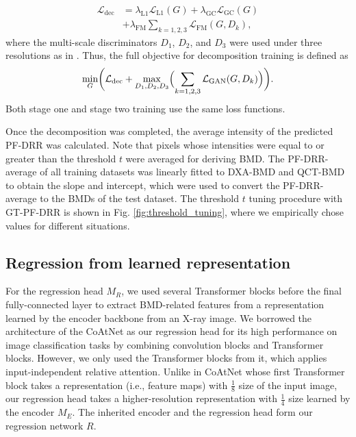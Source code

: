 \documentclass[times,twocolumn,final]{elsarticle}
\begin{document}
{\begin{equation}
\begin{split}
    \mathcal{L}_{\mathrm{dec}}
    & =\lambda_{\mathrm{L1}}\mathcal{L}_{\mathrm{L1}}(G)+\lambda_{\mathrm{GC}}\mathcal{L}_{\mathrm{GC}}(G)\\
    & +\lambda_{\mathrm{FM}}\sum_{k=1,2,3}\mathcal{L}_{\mathrm{FM}}(G,D_k),
\end{split}
\end{equation}
where the multi-scale discriminators $D_1$, $D_2$, and $D_3$ were used under three resolutions as in \citep{wang_high-resolution_2018}. Thus, the full objective for decomposition training is defined as
\begin{equation}
    \min_G\biggl(\mathcal{L}_{\mathrm{dec}}+\max_{D_1,D_2,D_3}\Bigl(\sum_{k=1,2,3}\mathcal{L}_{\mathrm{GAN}}(G,D_k)\Bigr)\biggr).
\end{equation}
Both stage one and stage two training use the same loss functions.

Once the decomposition was completed, the average intensity of the predicted PF-DRR was calculated. 
Note that pixels whose intensities were equal to or greater than the threshold $t$ were averaged for deriving BMD.
The PF-DRR-average of all training datasets was linearly fitted to DXA-BMD and QCT-BMD to obtain the slope and intercept, which were used to convert the PF-DRR-average to the BMDs of the test dataset.
The threshold $t$ tuning procedure with GT-PF-DRR is shown in Fig. \ref{fig:threshold_tuning}, where we empirically chose values for different situations.

\subsection{Regression from learned representation}
For the regression head $M_R$, we used several Transformer blocks before the final fully-connected layer to extract BMD-related features from a representation learned by the encoder backbone from an X-ray image.
We borrowed the architecture of the CoAtNet \citep{dai_coatnet_2021} as our regression head for its high performance on image classification tasks by combining convolution blocks and Transformer blocks. 
However, we only used the Transformer blocks from it, which applies input-independent relative attention. 
Unlike in CoAtNet whose first Transformer block takes a representation (i.e., feature maps) with $\frac{1}{8}$ size of the input image, our regression head takes a higher-resolution representation with $\frac{1}{4}$ size learned by the encoder $M_E$. 
The inherited encoder and the regression head form our regression network $R$.

}
\end{document}
